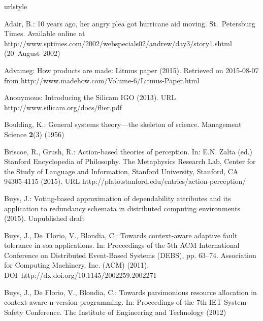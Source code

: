 \documentclass[twocolumn]{svjour3}
\begin{document}


\begin{thebibliography}{10}
\providecommand{\url}[1]{{#1}}
\providecommand{\urlprefix}{URL }
\expandafter\ifx\csname urlstyle\endcsname\relax
  \providecommand{\doi}[1]{DOI~\discretionary{}{}{}#1}\else
  \providecommand{\doi}{DOI~\discretionary{}{}{}\begingroup
  \urlstyle{rm}\Url}\fi

Adair, B.: 10 years ago, her angry plea got hurricane aid moving.
\newblock St.~Petersburg Times. Available online at
  \url{http://www.sptimes.com/2002/webspecials02/andrew/day3/story1.shtml}
  (20~August~2002)

Advameg: How products are made: Litmus paper (2015).
\newblock Retrieved on 2015-08-07 from
  \url{http://www.madehow.com/Volume-6/Litmus-Paper.html}

Anonymous: Introducing the {S}ilicam {IGO} (2013).
\newblock \urlprefix\url{http://www.silicam.org/docs/flier.pdf}

Boulding, K.: General systems theory---the skeleton of science.
\newblock Management Science \textbf{2}(3) (1956)

Briscoe, R., Grush, R.: Action-based theories of perception.
\newblock In: E.N. Zalta (ed.) Stanford Encyclopedia of Philosophy. The
  Metaphysics Research Lab, Center for the Study of Language and Information,
  Stanford University, Stanford, CA 94305-4115 (2015).
\newblock \urlprefix\url{http://plato.stanford.edu/entries/action-perception/}

Buys, J.: Voting-based approximation of dependability attributes and its
  application to redundancy schemata in distributed computing environments
  (2015).
\newblock Unpublished draft

Buys, J., {De~Florio}, V., Blondia, C.: Towards context-aware adaptive fault
  tolerance in soa applications.
\newblock In: Proceedings of the 5th ACM International Conference on
  Distributed Event-Based Systems (DEBS), pp. 63--74. Association for Computing
  Machinery, Inc. (ACM) (2011).
\newblock \doi{http://dx.doi.org/10.1145/2002259.2002271}

Buys, J., {De Florio}, V., Blondia, C.: Towards parsimonious resource
  allocation in context-aware n-version programming.
\newblock In: Proceedings of the 7th IET System Safety Conference. The
  Institute of Engineering and Technology (2012)


\end{thebibliography}
\end{document}
